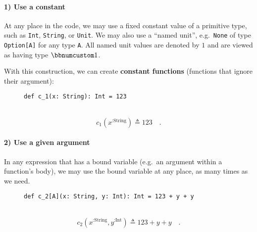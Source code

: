 \paragraph{1) Use a constant}

At any place in the code, we may use a fixed constant value of a primitive
type, such as \lstinline!Int!, \lstinline!String!, or \lstinline!Unit!.
We may also use a \textsf{``}named unit\textsf{''}, e.g.~\lstinline!None!
of type \lstinline!Option[A]! for any type \lstinline!A!. All named
unit values are denoted by $1$ and are viewed as having type $\bbnum 1$. 

With this construction, we can create \textbf{constant
functions} (functions that ignore their argument):

\begin{wrapfigure}{l}{0.5\columnwidth}%
\vspace{-0.65\baselineskip}
\begin{lstlisting}
def c_1(x: String): Int = 123
\end{lstlisting}

\vspace{-0.25\baselineskip}
\end{wrapfigure}%

~\vspace{-0.35\baselineskip}
\[
c_{1}(x^{:\text{String}})\triangleq123\quad.
\]
\vspace{-0.85\baselineskip}


\paragraph{2) Use a given argument}

In any expression that has a bound variable (e.g.~an argument within
a function's body), we may use the bound variable at any place, as
many times as we need.

\begin{wrapfigure}{l}{0.5\columnwidth}%
\vspace{-0.65\baselineskip}
\begin{lstlisting}
def c_2[A](x: String, y: Int): Int = 123 + y + y
\end{lstlisting}

\vspace{-0.25\baselineskip}
\end{wrapfigure}%

~\vspace{-0.35\baselineskip}
\[
c_{2}(x^{:\text{String}},y^{:\text{Int}})\triangleq123+y+y\quad.
\]
\vspace{-0.85\baselineskip}


